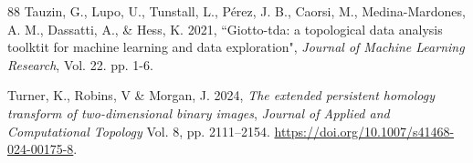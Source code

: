 \documentclass[a4paper,11pt]{article}
\theoremstyle{definition}
\begin{document}
\begin{thebibliography}{88}
  Tauzin, G., Lupo, U., Tunstall, L., P\'{e}rez, J. B., Caorsi, M., Medina-Mardones, A. M., Dassatti, A., \& Hess, K. 2021, ``Giotto-tda: a topological data analysis toolktit for machine learning and data exploration", \textit{Journal of Machine Learning Research}, Vol. 22. pp. 1-6.
 
 
 
  Turner, K., Robins, V \& Morgan, J. 2024, \textit{The extended persistent homology transform of two-dimensional binary images},  \textit{Journal of Applied and Computational Topology} Vol. 8, pp. 2111–2154. \url{https://doi.org/10.1007/s41468-024-00175-8}.





\end{thebibliography}
\end{document}
